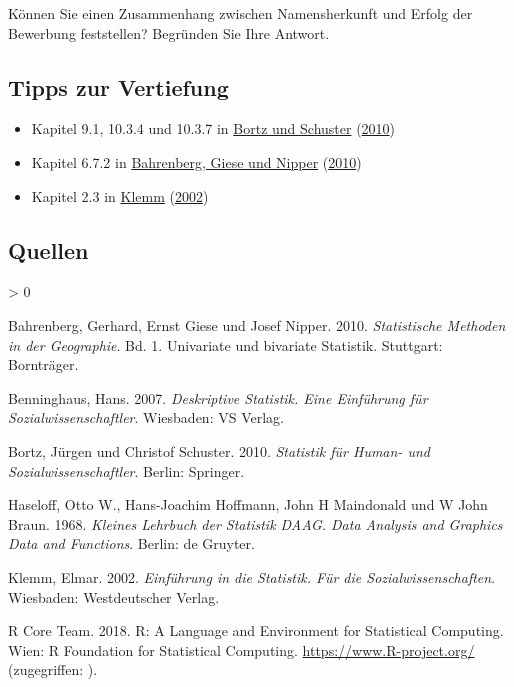 \documentclass[
  ngerman,
]{article}
\providecommand{\tightlist}{%
  \setlength{\itemsep}{0pt}\setlength{\parskip}{0pt}}
\newlength{\cslhangindent}
\newenvironment{CSLReferences}[2] %
 {%
  \setlength{\parindent}{0pt}
  \ifodd #1 \everypar{\setlength{\hangindent}{\cslhangindent}}\ignorespaces\fi
  \ifnum #2 > 0
  \setlength{\parskip}{#2\baselineskip}
  \fi
 }%
 {}
\begin{document}
Können Sie einen Zusammenhang zwischen Namensherkunft und Erfolg der Bewerbung feststellen? Begründen Sie Ihre Antwort.

\hypertarget{tipps-zur-vertiefung-8}{%
\subsection{Tipps zur Vertiefung}\label{tipps-zur-vertiefung-8}}

\begin{itemize}
\tightlist
\item
  Kapitel 9.1, 10.3.4 und 10.3.7 in \protect\hyperlink{ref-bortz}{Bortz und Schuster} (\protect\hyperlink{ref-bortz}{2010})
\item
  Kapitel 6.7.2 in \protect\hyperlink{ref-bahrenberg}{Bahrenberg, Giese und Nipper} (\protect\hyperlink{ref-bahrenberg}{2010})
\item
  Kapitel 2.3 in \protect\hyperlink{ref-klemm}{Klemm} (\protect\hyperlink{ref-klemm}{2002})
\end{itemize}

\hypertarget{quellen-8}{%
\subsection{Quellen}\label{quellen-8}}

\hypertarget{refs}{}
\begin{CSLReferences}{1}{0}
\leavevmode\hypertarget{ref-bahrenberg}{}%
Bahrenberg, Gerhard, Ernst Giese und Josef Nipper. 2010. \emph{Statistische Methoden in der Geographie}. Bd. 1. Univariate und bivariate Statistik. Stuttgart: Bornträger.

\leavevmode\hypertarget{ref-benninghaus}{}%
Benninghaus, Hans. 2007. \emph{Deskriptive Statistik. Eine Einführung für Sozialwissenschaftler}. Wiesbaden: VS Verlag.

\leavevmode\hypertarget{ref-bortz}{}%
Bortz, Jürgen und Christof Schuster. 2010. \emph{Statistik für Human- und Sozialwissenschaftler}. Berlin: Springer.

\leavevmode\hypertarget{ref-haseloff}{}%
Haseloff, Otto W., Hans-Joachim Hoffmann, John H Maindonald und W John Braun. 1968. \emph{Kleines Lehrbuch der Statistik DAAG. Data Analysis and Graphics Data and Functions}. Berlin: de Gruyter.

\leavevmode\hypertarget{ref-klemm}{}%
Klemm, Elmar. 2002. \emph{Einführung in die Statistik. Für die Sozialwissenschaften}. Wiesbaden: Westdeutscher Verlag.

\leavevmode\hypertarget{ref-r}{}%
R Core Team. 2018. R: A Language and Environment for Statistical Computing. Wien: R Foundation for Statistical Computing. \url{https://www.R-project.org/} (zugegriffen: ).

\end{CSLReferences}
\end{document}

